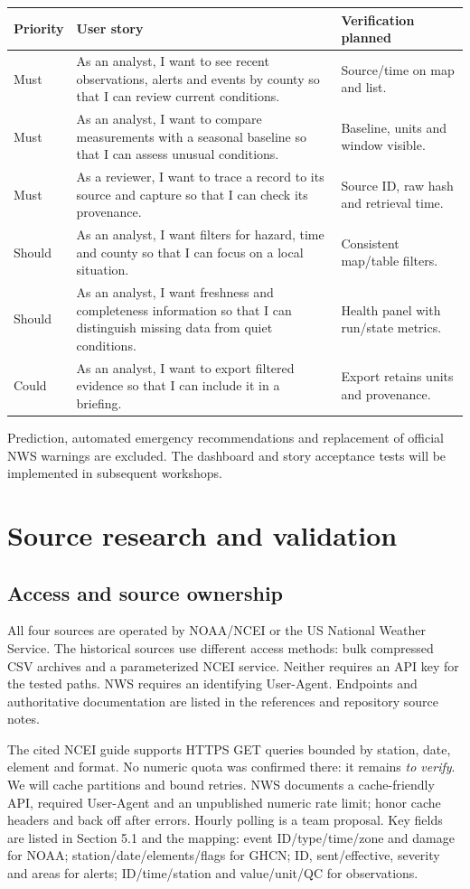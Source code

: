 \begin{longtable}{L{1.3cm}L{10.5cm}L{3.1cm}}
\toprule Priority & User story & Verification planned \\
\midrule\endhead
Must & As an analyst, I want to see recent observations, alerts and events by county so that I can review current conditions. & Source/time on map and list. \\
Must & As an analyst, I want to compare measurements with a seasonal baseline so that I can assess unusual conditions. & Baseline, units and window visible. \\
Must & As a reviewer, I want to trace a record to its source and capture so that I can check its provenance. & Source ID, raw hash and retrieval time. \\
Should & As an analyst, I want filters for hazard, time and county so that I can focus on a local situation. & Consistent map/table filters. \\
Should & As an analyst, I want freshness and completeness information so that I can distinguish missing data from quiet conditions. & Health panel with run/state metrics. \\
Could & As an analyst, I want to export filtered evidence so that I can include it in a briefing. & Export retains units and provenance. \\
\bottomrule
\end{longtable}
Prediction, automated emergency recommendations and replacement of official NWS
warnings are excluded. The dashboard and story acceptance tests will be
implemented in subsequent workshops.

\section{Source research and validation}
\subsection{Access and source ownership}
All four sources are operated by NOAA/NCEI or the US National Weather Service.
The historical sources use different access methods: bulk compressed CSV archives
and a parameterized NCEI service. Neither requires an API key for the tested
paths. NWS requires an identifying User-Agent. Endpoints and authoritative
documentation are listed in the references and repository source notes.

The cited NCEI guide supports HTTPS GET queries bounded by station, date,
element and format. No numeric quota was confirmed there: it remains
\emph{to verify}. We will cache partitions and bound retries. NWS documents a
cache-friendly API, required User-Agent and an unpublished numeric rate limit;
honor cache headers and back off after errors. Hourly polling is a team proposal.
Key fields are listed in Section 5.1 and the mapping: event ID/type/time/zone and
damage for NOAA; station/date/elements/flags for GHCN; ID, sent/effective,
severity and areas for alerts; ID/time/station and value/unit/QC for observations.

